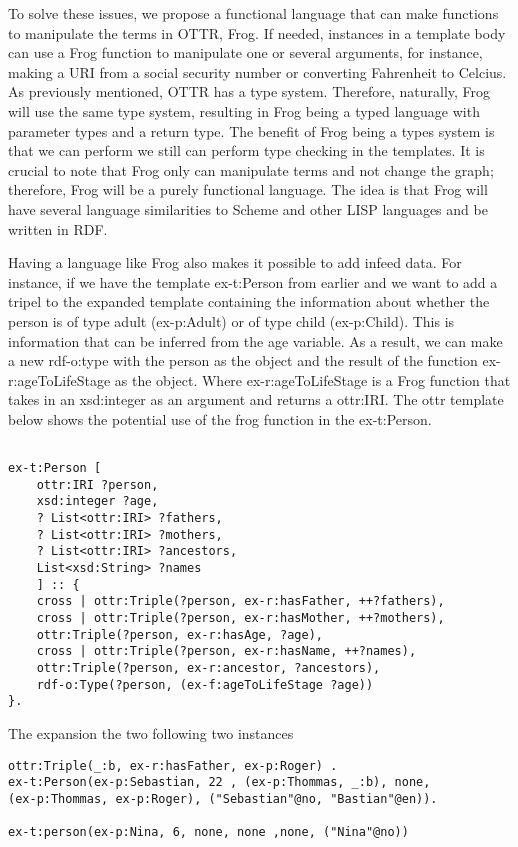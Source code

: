 \para
To solve these issues, we propose a functional language that can make functions to manipulate the terms in OTTR, Frog. If needed, instances in a template body can use a Frog function to manipulate one or several arguments, for instance,  making a URI from a social security number or converting  Fahrenheit to Celcius. As previously mentioned, OTTR has a type system. Therefore, naturally, Frog will use the same type system, resulting in Frog being a typed language with parameter types and a return type.  The benefit of Frog being a types system is that we can perform we still can perform type checking in the templates. It is crucial to note that Frog only can manipulate terms and not change the graph; therefore, Frog will be a purely functional language. The idea is that Frog will have several language similarities to Scheme and other LISP languages and be written in RDF.

\para
Having a language like Frog also makes it possible to add infeed data. For instance, if we have the template ex-t:Person from earlier and we want to add a tripel to the expanded template containing the information about whether the person is of type adult (ex-p:Adult) or of type child (ex-p:Child). This is information that can be inferred from the age variable. As a result, we can make a new rdf-o:type with the person as the object and the result of the function ex-r:ageToLifeStage as the object. Where ex-r:ageToLifeStage is a Frog function that takes in an xsd:integer as an argument and returns a ottr:IRI. The ottr template below shows the potential use of the frog function in the ex-t:Person.

\begin{lstlisting}[frame=single]
    
ex-t:Person [
    ottr:IRI ?person,
    xsd:integer ?age,
    ? List<ottr:IRI> ?fathers,
    ? List<ottr:IRI> ?mothers,
    ? List<ottr:IRI> ?ancestors,
    List<xsd:String> ?names
    ] :: {
    cross | ottr:Triple(?person, ex-r:hasFather, ++?fathers),
    cross | ottr:Triple(?person, ex-r:hasMother, ++?mothers),
    ottr:Triple(?person, ex-r:hasAge, ?age),
    cross | ottr:Triple(?person, ex-r:hasName, ++?names),
    ottr:Triple(?person, ex-r:ancestor, ?ancestors),
    rdf-o:Type(?person, (ex-f:ageToLifeStage ?age))
}.
\end{lstlisting}

The expansion the two following two instances

\begin{lstlisting}[frame=single]
ottr:Triple(_:b, ex-r:hasFather, ex-p:Roger) .
ex-t:Person(ex-p:Sebastian, 22 , (ex-p:Thommas, _:b), none, 
(ex-p:Thommas, ex-p:Roger), ("Sebastian"@no, "Bastian"@en)).

ex-t:person(ex-p:Nina, 6, none, none ,none, ("Nina"@no))
\end{lstlisting}

